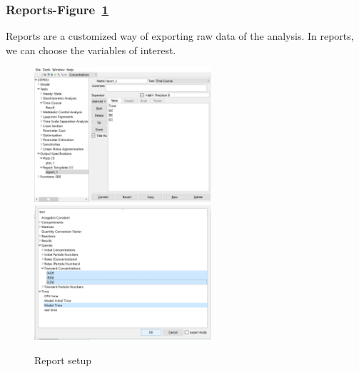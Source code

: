 \documentclass[10pt]{article}
\theoremstyle{definition}
\theoremstyle{remark}
\begin{document}
	\subsubsection{Reports-Figure~\ref{9png}}
	Reports are a customized way of exporting raw data of the analysis. In reports, we can choose the variables of interest.
	\begin{figure}[!htb]
		\centering
		\includegraphics[height=5cm]{Images/9a.png}
		\includegraphics[height=5cm]{Images/9b.png}
		\caption{Report setup}
		\label{9png}
	\end{figure}
\end{document}
